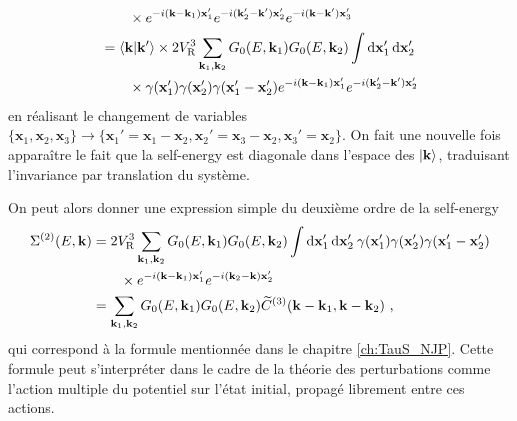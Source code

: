 \begin{align}
&\nonumber \qquad\times e^{-i(\mathbf{k}-\mathbf{k}_{\mathrm{1}})\mathbf{x}_{\mathrm{1}}'} e^{-i(\mathbf{k}_{\mathrm{2}}'-\mathbf{k}')\mathbf{x}_{\mathrm{2}}'} e^{-i(\mathbf{k}-\mathbf{k}')\mathbf{x}_{\mathrm{3}}'} \\
&=\langle \mathbf{k} | \mathbf{k}'\rangle \times 2 V_{\mathrm{R}}^3 \sum_{\mathbf{k}_{\mathrm{1}},\mathbf{k}_{\mathrm{2}}}{G_0(E,\mathbf{k}_{\mathrm{1}}) G_0(E,\mathbf{k}_{\mathrm{2}})} \int{\mathop{}\mathopen{}\mathrm{d}\mathbf{x}_{\mathrm{1}}'\mathop{}\mathopen{}\mathrm{d}\mathbf{x}_{\mathrm{2}}'} \\
&\nonumber \qquad\times \gamma(\mathbf{x}_{\mathrm{1}}')\gamma(\mathbf{x}_{\mathrm{2}}')\gamma(\mathbf{x}_{\mathrm{1}}'-\mathbf{x}_{\mathrm{2}}') e^{-i(\mathbf{k}-\mathbf{k}_{\mathrm{1}})\mathbf{x}_{\mathrm{1}}'} e^{-i(\mathbf{k}_{\mathrm{2}}'-\mathbf{k}')\mathbf{x}_{\mathrm{2}}'}
\end{align}
en réalisant le changement de variables $\lbrace \mathbf{x}_{\mathrm{1}},\mathbf{x}_{\mathrm{2}},\mathbf{x}_{\mathrm{3}}\rbrace \rightarrow \lbrace \mathbf{x}_{\mathrm{1}}'=\mathbf{x}_{\mathrm{1}}-\mathbf{x}_{\mathrm{2}}, \mathbf{x}_{\mathrm{2}}'=\mathbf{x}_{\mathrm{3}}-\mathbf{x}_{\mathrm{2}}, \mathbf{x}_{\mathrm{3}}'=\mathbf{x}_{\mathrm{2}}\rbrace$. On fait une nouvelle fois apparaître le fait que la self-energy est diagonale dans l'espace des $\left| \mathbf{k} \right\rangle$, traduisant l'invariance par translation du système. 

On peut alors donner une expression simple du deuxième ordre de la self-energy
\begin{align}
\Sigma^{(2)}(E,\mathbf{k})&= 2V_{\mathrm{R}}^3 \sum_{\mathbf{k}_{\mathrm{1}},\mathbf{k}_{\mathrm{2}}}{G_0(E,\mathbf{k}_{\mathrm{1}}) G_0(E,\mathbf{k}_{\mathrm{2}})} \int{\mathop{}\mathopen{}\mathrm{d}\mathbf{x}_{\mathrm{1}}' \mathop{}\mathopen{}\mathrm{d}\mathbf{x}_{\mathrm{2}}' \: \gamma(\mathbf{x}_{\mathrm{1}}')\gamma(\mathbf{x}_{\mathrm{2}}')\gamma(\mathbf{x}_{\mathrm{1}}'-\mathbf{x}_{\mathrm{2}}')}\\
&\nonumber\qquad\times e^{-i(\mathbf{k}-\mathbf{k}_{\mathrm{1}})\mathbf{x}_{\mathrm{1}}'} e^{-i(\mathbf{k}_{\mathrm{2}}-\mathbf{k})\mathbf{x}_{\mathrm{2}}'} \\
&= \sum_{\mathbf{k}_{\mathrm{1}},\mathbf{k}_{\mathrm{2}}}{G_0(E,\mathbf{k}_{\mathrm{1}}) G_0(E,\mathbf{k}_{\mathrm{2}}) \widetilde{C}^{(3)}(\mathbf{k}-\mathbf{k}_{\mathrm{1}},\mathbf{k}-\mathbf{k}_{\mathrm{2}})} \text{ ,}
\end{align}
qui correspond à la formule mentionnée dans le chapitre \ref{ch:TauS_NJP}. Cette formule peut s'interpréter dans le cadre de la théorie des perturbations comme l'action multiple du potentiel sur l'état initial, propagé librement entre ces actions.



